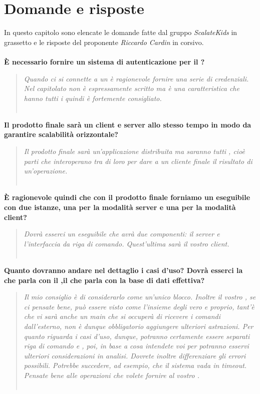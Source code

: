 \documentclass{scalatekids-article}
\begin{document}
\section{Domande e risposte}
In questo capitolo sono elencate le domande fatte dal gruppo \textit{ScalateKids} in grassetto e le risposte del proponente \textit{Riccardo Cardin} in corsivo.
\textbf{\\ \\È necessario fornire un sistema di autenticazione per il ?}
\begin{quote}
  \textit{Quando ci si connette a un  è ragionevole fornire una serie di
    credenziali. Nel capitolato non è espressamente scritto ma è una
    caratteristica che hanno tutti i  quindi è fortemente
    consigliato.\\ \\}
\end{quote}
\textbf{Il prodotto finale sarà un client e server allo stesso tempo in modo da garantire scalabilità orizzontale?}
\begin{quote}
  \textit{Il prodotto finale sarà un'applicazione distribuita ma saranno tutti
    , cioè parti che interoperano tra di loro per dare a un cliente
    finale il risultato di un'operazione.\\ \\}
\end{quote}
\textbf{È ragionevole quindi che con il prodotto finale forniamo un eseguibile con due istanze, una per la modalità server e una per la modalità client?}
\begin{quote}
  \textit{Dovrà esserci un eseguibile che avrà due componenti: il server e
    l'interfaccia da riga di comando. Quest'ultima sarà il vostro client.\\ \\}
\end{quote}
\textbf{Quanto dovranno andare nel dettaglio i casi d'uso? Dovrà esserci la  che parla con il ,il  che parla con la base di dati effettiva?}
\begin{quote}
  \textit{Il mio consiglio è di considerarlo come un'unico blocco. Inoltre il
    vostro , se ci pensate bene, può essere visto come l'insieme
    degli  vero e proprio, tant'è che vi sarà anche un
     main che si occuperà di ricevere i comandi dall'esterno, non
    è dunque obbligatorio aggiungere ulteriori astrazioni. Per quanto riguarda i
    casi d'uso, dunque, potranno certamente essere separati riga di comando e
    , poi, in base a cosa intendete voi per 
    potranno esservi ulteriori considerazioni in analisi.
    Dovrete inoltre differenziare gli errori possibili. Potrebbe succedere, ad
    esempio, che il sistema vada in timeout. Pensate bene alle operazioni che
    volete fornire al vostro .\\ \\}
\end{quote}
\end{document}
